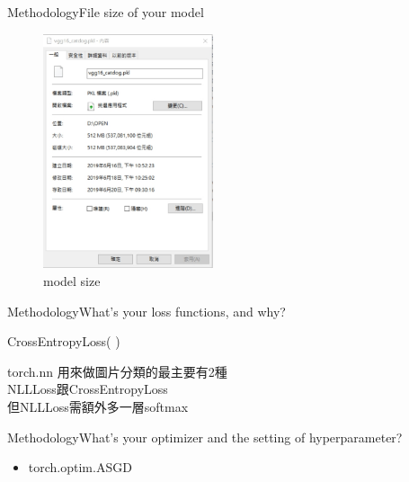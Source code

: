 \documentclass{beamer}
\begin{document}
\begin{frame}{Methodology}{File size of your model }
\begin{CJK*}{UTF8}{bsmi}
\begin{figure}[h]
\begin{center}
\includegraphics[width=5cm]{model.jpg} 
\end{center} 
\label{fig:1} 
\caption{model size} 
\end{figure}
\end{CJK*}
\end{frame}

\begin{frame}{Methodology}{What's your loss functions, and why? }
\begin{CJK*}{UTF8}{bsmi}
  \begin{itemize}
  \item {
CrossEntropyLoss( )\\
 \item {
torch.nn 用來做圖片分類的最主要有2種\\
NLLLoss跟CrossEntropyLoss\\
但NLLLoss需額外多一層softmax\\
  }
  }
  \end{itemize}
\end{CJK*}
\end{frame}

\begin{frame}{Methodology}{What's your optimizer and the setting of hyperparameter?}
\begin{CJK*}{UTF8}{bsmi}
  \begin{itemize}
  \item {
torch.optim.ASGD
  }
  \end{itemize}
\end{CJK*}
\end{frame}
\end{document}
